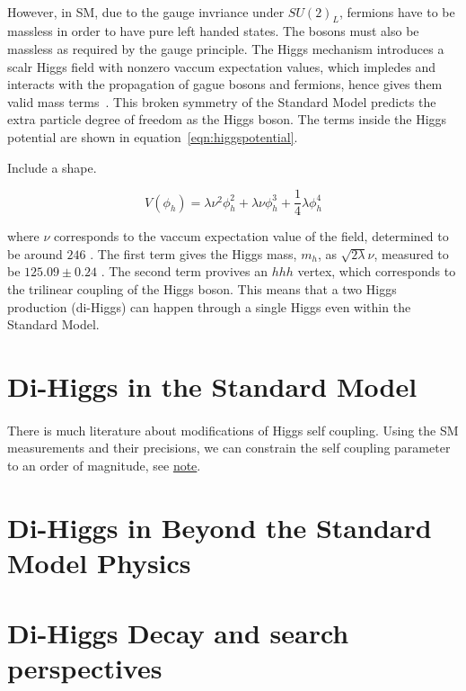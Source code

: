 \paragraph{}
However, in SM, due to the gauge invriance under $SU(2)_{L}$, fermions have to be massless in order to have pure left handed states. 
The bosons must also be massless as required by the gauge principle. 
The Higgs mechanism introduces a scalr Higgs field with nonzero vaccum expectation values, which impledes and interacts with the propagation of gague bosons and fermions, hence gives them valid mass terms~\cite{Tully}. 
This broken symmetry of the Standard Model predicts the extra particle degree of freedom as the Higgs boson. The terms inside the Higgs potential are shown in equation~\ref{eqn:higgspotential}.

Include a shape.

\begin{equation}
\label{eqn:higgspotential}
V(\phi_{h}) = \lambda \nu^2 \phi_{h} ^2  + \lambda \nu \phi_{h} ^3  + \frac{1}{4}\lambda \phi_{h} ^4 
\end{equation}

where $\nu$ corresponds to the vaccum expectation value of the field, determined to be around $246$ \GeV.
The first term gives the Higgs mass, $m_h$, as $ \sqrt{2\lambda}\nu$, measured to be $125.09 \pm 0.24$ \GeV. 
The second term provives an $hhh$ vertex, which corresponds to the trilinear coupling of the Higgs boson. 
This means that a two Higgs production (di-Higgs) can happen through a single Higgs even within the Standard Model.

\section{Di-Higgs in the Standard Model}
\paragraph{}
There is much literature about modifications of Higgs self coupling. Using the SM measurements and their precisions, we can constrain the self coupling parameter to an order of magnitude, see \href{https://arxiv.org/abs/1702.07678}{note}.


\section{Di-Higgs in Beyond the Standard Model Physics}


\section{Di-Higgs Decay and search perspectives}

